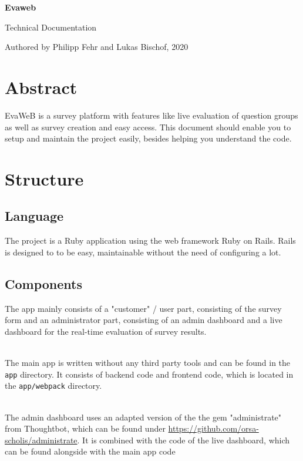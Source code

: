 \documentclass[11pt]{article}
\begin{document}
\begin{titlepage}
	\begin{center}
		\Large\textbf{Evaweb}
	\end{center}
	\begin{center}
		Technical Documentation
	\end{center}
	\begin{center}
		Authored by Philipp Fehr and Lukas Bischof, 2020
	\end{center}
\end{titlepage}
\printindex
{}
\section{Abstract}
EvaWeB is a survey platform with features like live evaluation of question groups
as well as survey creation and easy access.
This document should enable you to setup and maintain the project easily, besides helping you understand the code.


\pagebreak
{}
\section{Structure}
\subsection{Language}
\setlength{\parindent}{0ex}
The project is a Ruby application using the web framework Ruby on Rails.
Rails is designed to to be easy, maintainable without the need of configuring a lot.
\subsection{Components}
The app mainly consists of a "customer" / user part, consisting of the survey form
and an administrator part, consisting of an admin dashboard and a live dashboard for the real-time evaluation of survey results.

\par ~\\
The main app is written without any third party tools and can be found in the \verb|app| directory.
It consists of backend code and frontend code, which is located in the \verb|app/webpack| directory.

\par ~\\
The admin dashboard uses an adapted version of the the gem "administrate" from Thoughtbot,
which can be found under \url{https://github.com/orsa-scholis/administrate}.
It is combined with the code of the live dashboard, which can be found alongside with the main app code
\end{document}
